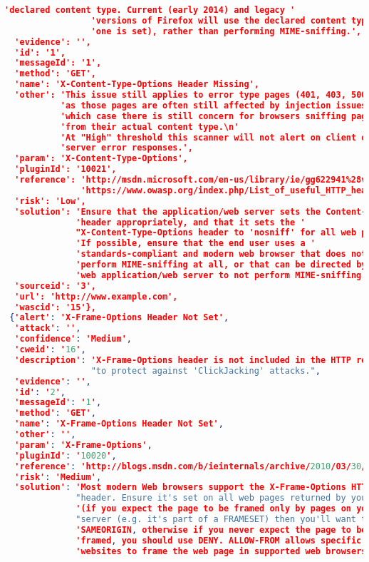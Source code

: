 \begin{lstlisting}[language=json,label={lst:owas_zap_welcome_message_alerts},caption={Alerts showed with NGINX default configuration}]
                 'declared content type. Current (early 2014) and legacy '
                 'versions of Firefox will use the declared content type (if '
                 'one is set), rather than performing MIME-sniffing.',
  'evidence': '',
  'id': '1',
  'messageId': '1',
  'method': 'GET',
  'name': 'X-Content-Type-Options Header Missing',
  'other': 'This issue still applies to error type pages (401, 403, 500, etc) '
           'as those pages are often still affected by injection issues, in '
           'which case there is still concern for browsers sniffing pages away '
           'from their actual content type.\n'
           'At "High" threshold this scanner will not alert on client or '
           'server error responses.',
  'param': 'X-Content-Type-Options',
  'pluginId': '10021',
  'reference': 'http://msdn.microsoft.com/en-us/library/ie/gg622941%28v=vs.85%29.aspx\n'
               'https://www.owasp.org/index.php/List_of_useful_HTTP_headers',
  'risk': 'Low',
  'solution': 'Ensure that the application/web server sets the Content-Type '
              'header appropriately, and that it sets the '
              "X-Content-Type-Options header to 'nosniff' for all web pages.\n"
              'If possible, ensure that the end user uses a '
              'standards-compliant and modern web browser that does not '
              'perform MIME-sniffing at all, or that can be directed by the '
              'web application/web server to not perform MIME-sniffing.',
  'sourceid': '3',
  'url': 'http://www.example.com',
  'wascid': '15'},
 {'alert': 'X-Frame-Options Header Not Set',
  'attack': '',
  'confidence': 'Medium',
  'cweid': '16',
  'description': 'X-Frame-Options header is not included in the HTTP response '
                 "to protect against 'ClickJacking' attacks.",
  'evidence': '',
  'id': '2',
  'messageId': '1',
  'method': 'GET',
  'name': 'X-Frame-Options Header Not Set',
  'other': '',
  'param': 'X-Frame-Options',
  'pluginId': '10020',
  'reference': 'http://blogs.msdn.com/b/ieinternals/archive/2010/03/30/combating-clickjacking-with-x-frame-options.aspx',
  'risk': 'Medium',
  'solution': 'Most modern Web browsers support the X-Frame-Options HTTP '
              "header. Ensure it's set on all web pages returned by your site "
              '(if you expect the page to be framed only by pages on your '
              "server (e.g. it's part of a FRAMESET) then you'll want to use "
              'SAMEORIGIN, otherwise if you never expect the page to be '
              'framed, you should use DENY. ALLOW-FROM allows specific '
              'websites to frame the web page in supported web browsers).',

\end{lstlisting}
